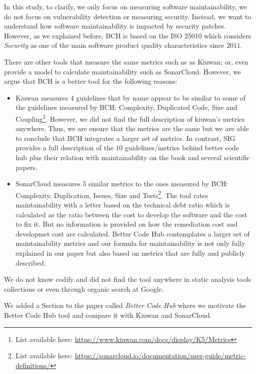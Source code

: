\documentclass[11pt,fleqn]{article}
\begin{document}
In this study, to clarify, we only focus on measuring software maintainability, we do not focus 
on vulnerability detection or measuring security. Instead, we want to understand how software 
maintainability is impacted by security patches. However, as we explained before, BCH is 
based on the ISO 25010 which considers \emph{Security} as one of the main software product quality 
characteristics since $2011$.

There are other tools that measure the same metrics such as as Kiuwan; or, even 
provide a model to calculate maintainability such as SonarCloud. However, we argue
that BCH is a better tool for the following reasons:

\begin{itemize}
    \item Kiuwan measures 4 guidelines that by name appear to be similar to 
    some of the guidelines measured by BCH: Complexity, Duplicated 
    Code, Size and Coupling\footnote{List available here: \url{https://www.kiuwan.com/docs/display/K5/Metrics}}. 
    However, we did not find the full description of kiuwan's metrics anywhere. Thus, 
    we are ensure that the metrics are the same but we are able to conclude that
    BCH integrates a larger set of metrics.  
    In contrast, 
    SIG provides a full description of the $10$ guidelines/metrics behind better code
    hub plus their relation with maintainability on the book and several scientific papers. 
    \item SonarCloud measures 5 similar metrics to the ones measured by BCH: Complexity, Duplication, 
    Issues, Size and Tests\footnote{List available here: \url{https://sonarcloud.io/documentation/user-guide/metric-definitions/}}. 
    The tool rates maintainability with a letter based on the technical 
    debt ratio which is calculated as the ratio between the cost to develop 
    the software and the cost to fix it. But no information is provided 
    on how the remediation cost and developmet cost are calculated. 
    Better Code Hub contemplates a larger set of maintainability metrics 
    and our formula for maintainability is not only fully explained in our paper but also 
    based on metrics that are fully and publicly described.  
\end{itemize}

We do not know codify and did not find the tool anywhere in static analysis tools 
collections or even through organic search at Google.  

We added a Section to 
the paper called \textit{Better Code Hub} where we motivate the Better Code Hub tool and 
compare it with Kiuwan and SonarCloud.
\end{document}
